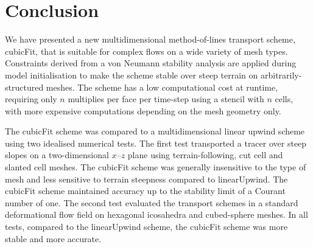 \section{Conclusion}
\label{sec:conclusion}

We have presented a new multidimensional method-of-lines transport scheme, cubicFit, that is suitable for complex flows on a wide variety of mesh types.  Constraints derived from a von Neumann stability analysis are applied during model initialisation to make the scheme stable over steep terrain on arbitrarily-structured meshes.
The scheme has a low computational cost at runtime, requiring only $n$ multiplies per face per time-step using a stencil with $n$ cells, with more expensive computations depending on the mesh geometry only.

The cubicFit scheme was compared to a multidimensional linear upwind scheme using two idealised numerical tests.  The first test transported a tracer over steep slopes on a two-dimensional $x$--$z$ plane using terrain-following, cut cell and slanted cell meshes.
The cubicFit scheme was generally insensitive to the type of mesh and less sensitive to terrain steepness compared to linearUpwind.  The cubicFit scheme maintained accuracy up to the stability limit of a Courant number of one.
The second test evaluated the transport schemes in a standard deformational flow field on hexagonal icosahedra and cubed-sphere meshes.
In all tests, compared to the linearUpwind scheme, the cubicFit scheme was more stable and more accurate.

